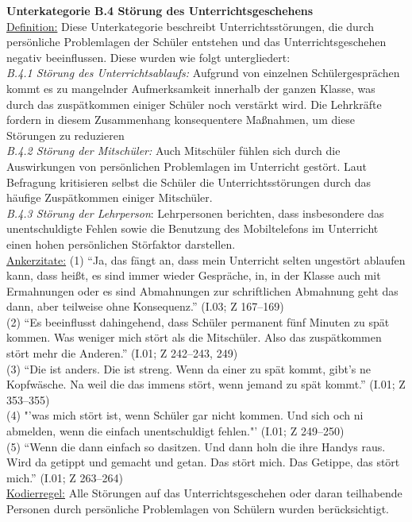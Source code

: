 \noindent
\textbf{Unterkategorie B.4 Störung des Unterrichtsgeschehens}\\
\underline{Definition:} Diese Unterkategorie beschreibt Unterrichtsstörungen, die durch persönliche Problemlagen der Schüler entstehen und das Unterrichtsgeschehen negativ beeinflussen. Diese wurden wie folgt untergliedert: \\
\textit{B.4.1 Störung des Unterrichtsablaufs:} Aufgrund von einzelnen Schülergesprächen kommt es zu mangelnder Aufmerksamkeit innerhalb der ganzen Klasse, was durch das zuspätkommen einiger Schüler noch verstärkt wird. Die Lehrkräfte fordern in diesem Zusammenhang konsequentere Maßnahmen, um diese Störungen zu reduzieren \\
\textit{B.4.2 Störung der Mitschüler:} Auch Mitschüler fühlen sich durch die Auswirkungen von persönlichen Problemlagen im Unterricht gestört. Laut Befragung kritisieren selbst die Schüler die Unterrichtsstörungen durch das häufige Zuspätkommen einiger Mitschüler.\\
\textit{B.4.3 Störung der Lehrperson}: Lehrpersonen berichten, dass insbesondere das unentschuldigte Fehlen sowie die Benutzung des Mobiltelefons im Unterricht einen hohen persönlichen Störfaktor darstellen. \\
\underline{Ankerzitate:} (1) "`Ja, das fängt an, dass mein Unterricht selten ungestört ablaufen kann, dass heißt, es sind immer wieder Gespräche, in, in der Klasse auch mit Ermahnungen oder es sind Abmahnungen zur schriftlichen Abmahnung geht das dann, aber teilweise ohne Konsequenz."' (I.03; Z 167--169)\\ (2) "`Es beeinflusst dahingehend, dass Schüler permanent fünf Minuten zu spät kommen. Was weniger mich stört als die Mitschüler. Also das zuspätkommen stört mehr die Anderen."' (I.01; Z 242--243, 249)\\ (3) "`Die ist anders. Die ist streng. Wenn da einer zu spät kommt, gibt’s ne Kopfwäsche. Na weil die das immens stört, wenn jemand zu spät kommt."' (I.01; Z 353--355)\\ (4) "'was mich stört ist, wenn Schüler gar nicht kommen. Und sich och ni abmelden, wenn die einfach unentschuldigt fehlen."' (I.01; Z 249--250)\\ (5) "`Wenn die dann einfach so dasitzen. Und dann holn die ihre Handys raus. Wird da getippt und gemacht und getan. Das stört mich. Das Getippe, das stört mich."' (I.01; Z 263--264)\\
\underline{Kodierregel:}  Alle Störungen auf das Unterrichtsgeschehen oder daran teilhabende Personen durch persönliche Problemlagen von Schülern wurden berücksichtigt.\\

